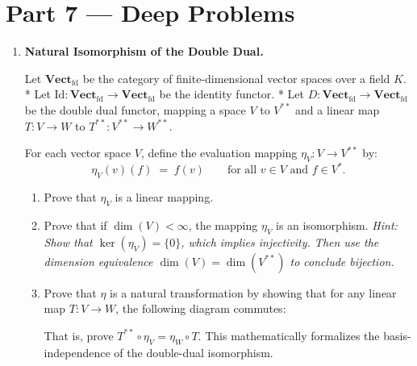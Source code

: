 \documentclass[12pt, a4paper]{article}
\begin{document}
\newpage

\section{Part 7 --- Deep Problems}

\begin{enumerate}[label=\textbf{D\arabic*.}]
  \item \textbf{Natural Isomorphism of the Double Dual.}
  
        Let $\mathbf{Vect}_{\text{fd}}$ be the category of finite-dimensional vector spaces over a field $K$.
        * Let $\text{Id}: \mathbf{Vect}_{\text{fd}} \to \mathbf{Vect}_{\text{fd}}$ be the identity functor.
        * Let $D: \mathbf{Vect}_{\text{fd}} \to \mathbf{Vect}_{\text{fd}}$ be the double dual functor, mapping a space $V$ to $V^{**}$ and a linear map $T: V \to W$ to $T^{**}: V^{**} \to W^{**}$.
        
        For each vector space $V$, define the evaluation mapping $\eta_V: V \to V^{**}$ by:
        \[
          \eta_V(v)(f) \;=\; f(v) \qquad \text{for all } v \in V \text{ and } f \in V^*.
        \]
        \begin{enumerate}[label=(\alph*)]
          \item Prove that $\eta_V$ is a linear mapping.
          \item Prove that if $\dim(V) < \infty$, the mapping $\eta_V$ is an isomorphism. \textit{Hint: Show that $\ker(\eta_V) = \{0\}$, which implies injectivity. Then use the dimension equivalence $\dim(V) = \dim(V^{**})$ to conclude bijection.}
          \item Prove that $\eta$ is a natural transformation by showing that for any linear map $T: V \to W$, the following diagram commutes:
          \begin{center}
          \end{center}
          That is, prove $T^{**} \circ \eta_V = \eta_W \circ T$. This mathematically formalizes the basis-independence of the double-dual isomorphism.
        \end{enumerate}


\end{enumerate}
\end{document}
